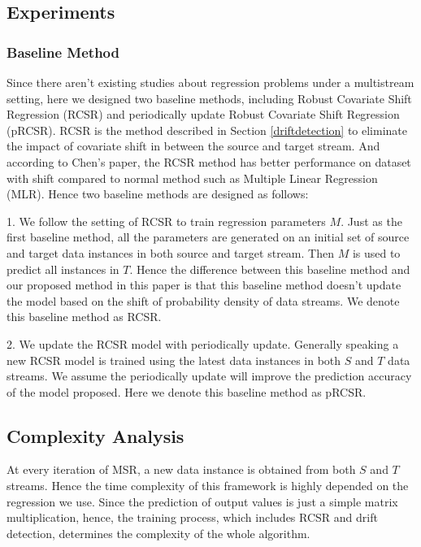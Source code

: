 \documentclass[conference,compsoc]{IEEEtran}
\begin{document}
\subsection{Experiments}
\subsubsection{Baseline Method}

Since there aren't existing studies about regression problems under a
multistream setting, here we designed two baseline methods, including Robust Covariate Shift Regression 
(RCSR) and periodically update Robust Covariate Shift Regression (pRCSR). RCSR is the method described in Section
\ref{driftdetection} to eliminate the impact of covariate shift in between the source and target stream. And according to Chen's paper, the RCSR method has better performance on dataset with shift compared to normal method such as Multiple Linear Regression (MLR). Hence two baseline methods are designed as follows:



1. We follow the setting of RCSR to train 
regression parameters $M$. Just as the first baseline method, all the 
parameters are generated on an initial set of source and target data 
instances in both source and target stream. Then $M$ is used to predict 
all instances in $T$. Hence the difference between this baseline method 
and our proposed method in this paper is that this baseline method doesn't 
update the model based on the shift of probability density of data streams. We denote this baseline method as RCSR.

2. We update the RCSR model with periodically update. Generally speaking a new RCSR model is trained using the latest data instances in both $S$ and $T$ data streams. We assume the periodically update will improve the prediction accuracy of the model proposed. Here we denote this baseline method as pRCSR.


\subsection{Complexity Analysis}
At every iteration of MSR, a new data instance is obtained from both $S$ and $T$ streams. Hence the time complexity of this framework is highly depended on the regression we use. Since the prediction of output values is just a simple matrix multiplication, hence, the training process, which includes RCSR and drift detection, determines the complexity of the whole algorithm.
\end{document}
